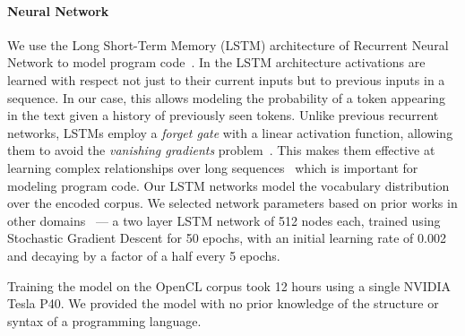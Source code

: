 \paragraph{Neural Network} We use the Long Short-Term Memory (LSTM) architecture of Recurrent Neural Network to model program code~\cite{Hochreiter1997}. In the LSTM architecture activations are learned with respect not just to their current inputs but to previous inputs in a sequence. In our case, this allows modeling the probability of a token appearing in the text given a history of previously seen tokens. Unlike previous recurrent networks, LSTMs employ a \emph{forget gate} with a linear activation function, allowing them to avoid the \emph{vanishing gradients} problem~\cite{Pacanu2013}. This makes them effective at learning complex relationships over long sequences~\cite{Lipton2015} which is important for modeling program code. Our LSTM networks model the vocabulary distribution over the encoded corpus. We selected network parameters based on prior works in other domains~\cite{Vinyals,Karpathy2016,Jozefowicz2016a} --- a two layer LSTM network of 512 nodes each, trained using Stochastic Gradient Descent for 50 epochs, with an initial learning rate of 0.002 and decaying by a factor of a half every 5 epochs.

Training the model on the OpenCL corpus took 12 hours using a single NVIDIA Tesla P40. We provided the model with no prior knowledge of the structure or syntax of a programming language.


